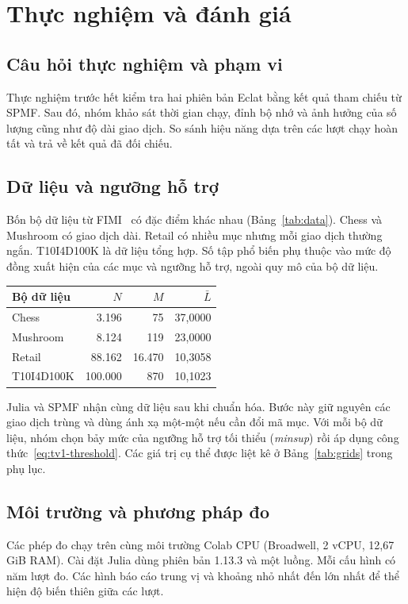 \section{Thực nghiệm và đánh giá}
\label{sec:benchmark}
\subsection{Câu hỏi thực nghiệm và phạm vi}
Thực nghiệm trước hết kiểm tra hai phiên bản Eclat bằng kết quả
tham chiếu từ SPMF. Sau đó, nhóm khảo sát thời gian chạy, đỉnh bộ nhớ
và ảnh hưởng của số lượng cũng như độ dài giao dịch. So sánh hiệu năng
dựa trên các lượt chạy hoàn tất và trả về kết quả đã đối chiếu.

\subsection{Dữ liệu và ngưỡng hỗ trợ}
Bốn bộ dữ liệu từ FIMI~\cite{fimi} có đặc điểm khác nhau
(Bảng~\ref{tab:data}). Chess và Mushroom có giao dịch dài. Retail
có nhiều mục nhưng mỗi giao dịch thường ngắn. T10I4D100K là dữ liệu
tổng hợp. Số tập phổ biến phụ thuộc vào mức độ đồng xuất hiện của
các mục và ngưỡng hỗ trợ, ngoài quy mô của bộ dữ liệu.

\begin{reporttable}
\caption{Số giao dịch $N$, số mục phân biệt $M$ và độ dài giao dịch trung bình $\bar L$ sau chuẩn hóa.}
\label{tab:data}
\small
\begin{tabular}{lrrr}\toprule
Bộ dữ liệu & $N$ & $M$ & $\bar L$\\\midrule
Chess & 3.196 & 75 & 37,0000\\
Mushroom & 8.124 & 119 & 23,0000\\
Retail & 88.162 & 16.470 & 10,3058\\
T10I4D100K & 100.000 & 870 & 10,1023\\\bottomrule
\end{tabular}
\end{reporttable}

Julia và SPMF nhận cùng dữ liệu sau khi chuẩn hóa. Bước này giữ
nguyên các giao dịch trùng và dùng ánh xạ một-một nếu cần đổi mã mục.
Với mỗi bộ dữ liệu, nhóm chọn bảy mức của ngưỡng hỗ trợ tối thiểu
(\textit{minsup}) rồi áp dụng công thức~\eqref{eq:tv1-threshold}.
Các giá trị cụ thể được liệt kê ở Bảng~\ref{tab:grids} trong phụ lục.

\subsection{Môi trường và phương pháp đo}
\label{sec:measurement-method}
Các phép đo chạy trên cùng môi trường Colab CPU (Broadwell, 2 vCPU,
12,67 GiB RAM). Cài đặt Julia dùng phiên bản 1.13.3 và một luồng.
Mỗi cấu hình có năm lượt đo. Các hình báo cáo trung vị và khoảng
nhỏ nhất đến lớn nhất để thể hiện độ biến thiên giữa các lượt.

